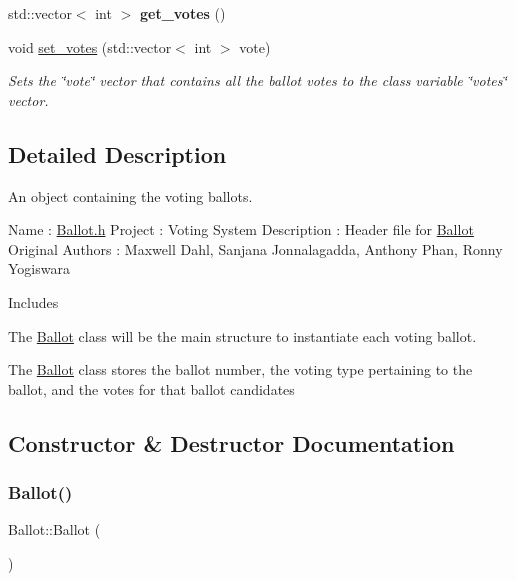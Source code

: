 \begin{DoxyCompactItemize}
\mbox{\label{class_ballot_aa276dba8f1cc470e04c6d71ad801fc5e}} 
std\+::vector$<$ int $>$ {\bfseries get\+\_\+votes} ()
\item 
void \mbox{\hyperlink{class_ballot_ad9ea6ccae93d16136d60b5847c36c7b0}{set\+\_\+votes}} (std\+::vector$<$ int $>$ vote)
\begin{DoxyCompactList}\small\item\em Sets the \char`\"{}vote\char`\"{} vector that contains all the ballot votes to the class variable \char`\"{}votes\char`\"{} vector. \end{DoxyCompactList}\end{DoxyCompactItemize}


\subsection{Detailed Description}
An object containing the voting ballots. 



 Name \+: \mbox{\hyperlink{_ballot_8h_source}{Ballot.\+h}} Project \+: Voting System Description \+: Header file for \mbox{\hyperlink{class_ballot}{Ballot}} Original Authors \+: Maxwell Dahl, Sanjana Jonnalagadda, Anthony Phan, Ronny Yogiswara



 Includes
\begin{DoxyItemize}
\item The \mbox{\hyperlink{class_ballot}{Ballot}} class will be the main structure to instantiate each voting ballot.
\item The \mbox{\hyperlink{class_ballot}{Ballot}} class stores the ballot number, the voting type pertaining to the ballot, and the votes for that ballot candidates 
\end{DoxyItemize}

\subsection{Constructor \& Destructor Documentation}
\mbox{\label{class_ballot_af9078126260b3f58ea91f6b82797396b}} 
\subsubsection{\texorpdfstring{Ballot()}{Ballot()}\hspace{0.1cm}{\footnotesize\ttfamily [1/2]}}
{\footnotesize\ttfamily Ballot\+::\+Ballot (\begin{DoxyParamCaption}{ }\end{DoxyParamCaption})}



